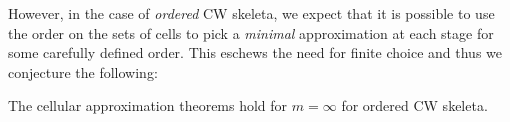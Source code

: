 \documentclass{easychair}
\begin{document}
%
However, in the case of \emph{ordered} CW skeleta, we expect that it is possible to use the order
on the sets of cells to pick a \emph{minimal} approximation at each stage for some carefully defined
order. This eschews the need for finite choice and thus we conjecture the following:
%
\begin{conjecture}\label{conj1}
  The cellular approximation theorems hold for $m = \infty$ for ordered CW skeleta.
\end{conjecture}


\label{sect:bib}

%
%
%



\end{document}
